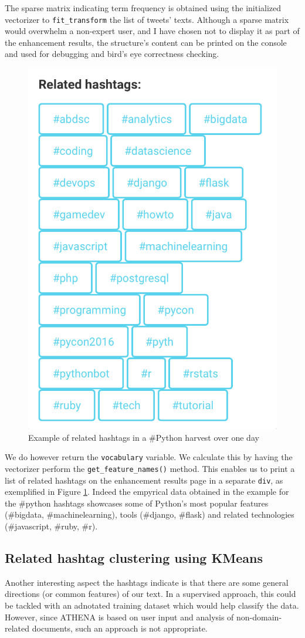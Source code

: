 \documentclass[12pt,a4paper,twoside]{report}
\begin{document}
The sparse matrix indicating term frequency is obtained using the initialized vectorizer to \texttt{fit\_transform} the list of tweets' texts. Although a sparse matrix would overwhelm a non-expert user, and I have chosen not to display it as part of the enhancement results, the structure's content can be printed on the console and used for debugging and bird's eye correctness checking.

\begin{figure}[ht]
    \centering
\includegraphics[width=0.5\columnwidth]{img/relhashtags.png}
    \caption{Example of related hashtags in a \#Python harvest over one day}
    \label{fig:relhashtags}
\end{figure}

We do however return the \texttt{vocabulary} variable. We calculate this by having the vectorizer perform the \texttt{get\_feature\_names()} method. This enables us to print a list of related hashtags on the enhancement results page in a separate \texttt{div}, as exemplified in Figure \ref{fig:relhashtags}. Indeed the empyrical data obtained in the example for the \#python hashtags showcases some of Python's most popular features (\#bigdata, \#machinelearning), tools (\#django, \#flask) and related technologies (\#javascript, \#ruby, \#r).

\subsection{Related hashtag clustering using KMeans}
Another interesting aspect the hashtags indicate is that there are some general directions (or common features) of our text. In a supervised approach, this could be tackled with an adnotated training dataset which would help classify the data. However, since ATHENA is based on user input and analysis of non-domain-related documents, such an approach is not appropriate.
\end{document}
